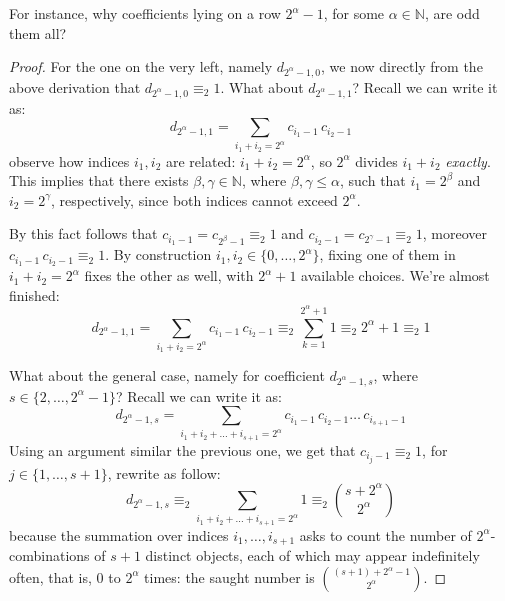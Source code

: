 \documentclass[11pt,a4paper]{article} %
\begin{document}
    For instance, why coefficients lying on a row $2^{\alpha}-1$, for
    some $\alpha\in\mathbb{N}$, are odd them all?
    \begin{proof}
        For the one on the very left, namely $d_{2^{\alpha}-1,0}$, we now
        directly from the above derivation that $d_{2^{\alpha}-1,0}\equiv_{2}1$. What about $d_{2^{\alpha}-1,1}$?
        Recall we can write it as:
        \begin{displaymath}
            d_{2^{\alpha}-1,1} = \sum_{i_{1}+ i_{2}=2^{\alpha}}{ c_{i_{1}-1}\,c_{i_{2}-1} }
        \end{displaymath}
        observe how indices $i_{1}, i_{2}$ are related: $i_{1}+ i_{2}=2^{\alpha}$,
        so $2^{\alpha}$ divides $i_{1}+i_{2}$ \emph{exactly}.
        This implies that there exists $\beta,\gamma\in\mathbb{N}$, where $\beta,\gamma\leq\alpha$,
        such that $i_{1}=2^{\beta}$ and $i_{2}=2^{\gamma}$, respectively, since both indices
        cannot exceed $2^{\alpha}$.

        By this fact follows that $c_{i_{1}-1}=c_{2^{\beta}-1}\equiv_{2}1$ and 
        $c_{i_{2}-1}=c_{2^{\gamma}-1}\equiv_{2}1$, moreover $c_{i_{1}-1}\,c_{i_{2}-1}\equiv_{2}1$.
        By construction $i_{1},i_{2}\in\lbrace0,\ldots,2^{\alpha}\rbrace$, fixing one of them in 
        $i_{1}+ i_{2}=2^{\alpha}$ fixes the other as well, with $2^{\alpha}+1$ available choices.
        We're almost finished:
        \begin{displaymath}
            d_{2^{\alpha}-1,1} = \sum_{i_{1}+ i_{2}=2^{\alpha}}{ c_{i_{1}-1}\,c_{i_{2}-1} }
                \equiv_{2} \sum_{k=1}^{2^{\alpha}+1}{1}\equiv_{2} 2^{\alpha}+1\equiv_{2} 1
        \end{displaymath}

        What about the general case, namely for coefficient $d_{2^{\alpha}-1,s}$, where
        $s\in\lbrace{2,\ldots,2^{\alpha}-1}\rbrace$?  Recall we can write it as:
        \begin{displaymath}
            d_{2^{\alpha}-1,s} = \sum_{i_{1}+i_{2}+\ldots+i_{s+1}=2^{\alpha}}
                {c_{i_{1}-1}\,c_{i_{2}-1}\ldots\,c_{i_{s+1}-1}}
        \end{displaymath}
        Using an argument similar the previous one, we get that $c_{i_{j}-1}\equiv_{2}1$,
        for $j\in\lbrace1,\ldots,s+1\rbrace$, rewrite as follow:
        \begin{displaymath}
            d_{2^{\alpha}-1,s} \equiv_{2} \sum_{i_{1}+i_{2}+\ldots+i_{s+1}=2^{\alpha}}{1}
                \equiv_{2} {{s+2^{\alpha}}\choose{2^{\alpha}}}
        \end{displaymath}
        because the summation over indices $i_{1},\ldots,i_{s+1}$ asks to 
        count the number of $2^{\alpha}$-combinations of $s+1$ distinct objects,
        each of which may appear indefinitely often, that is, $0$ to $2^{\alpha}$
        times: the saught number is ${{(s+1)+2^{\alpha}-1}\choose{2^{\alpha}}}$.


\end{proof}
\end{document}
